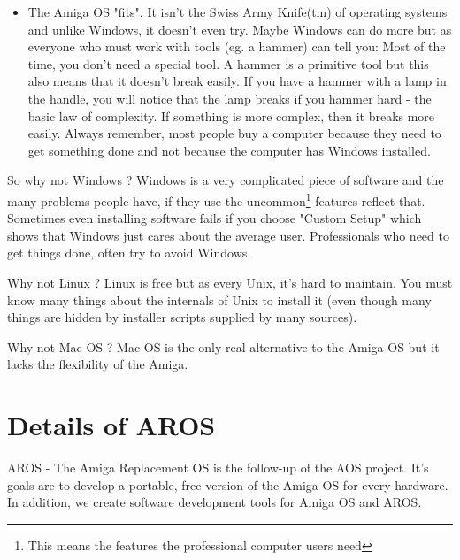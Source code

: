 \begin{itemize}
\item The Amiga OS "fits". It isn't the Swiss Army Knife(tm) of operating
systems and unlike Windows, it doesn't even try. Maybe Windows can do more
but as everyone who must work with tools (eg. a hammer) can tell you: Most
of the time, you don't need a special tool. A hammer is a primitive tool
but this also means that it doesn't break easily. If you have a hammer
with a lamp in the handle, you will notice that the lamp breaks if you
hammer hard - the basic law of complexity. If something is more complex,
then it breaks more easily. Always remember, most people buy a computer
because they need to get something done and not because the computer has
Windows installed.

\end{itemize}

So why not Windows ? Windows is a very complicated piece of software and the many
problems people have, if they use the uncommon\footnote{This means the
features the professional computer users need} features reflect that.
Sometimes even installing software fails if you choose "Custom Setup" which
shows that Windows just cares about the average user. Professionals who
need to get things done, often try to avoid Windows.

Why not Linux ? Linux is free but as every Unix, it's hard to maintain.
You must know many things about the internals of Unix to install it
(even though many things are hidden by installer scripts supplied by many
sources).

Why not Mac OS ? Mac OS is the only real alternative to the Amiga OS but it
lacks the flexibility of the Amiga.

\section{Details of AROS}

AROS - The Amiga Replacement OS is the follow-up of the AOS project.
It's goals are to develop a portable, free version of the Amiga OS for
every hardware. In addition, we create software development tools for
Amiga OS and AROS.

